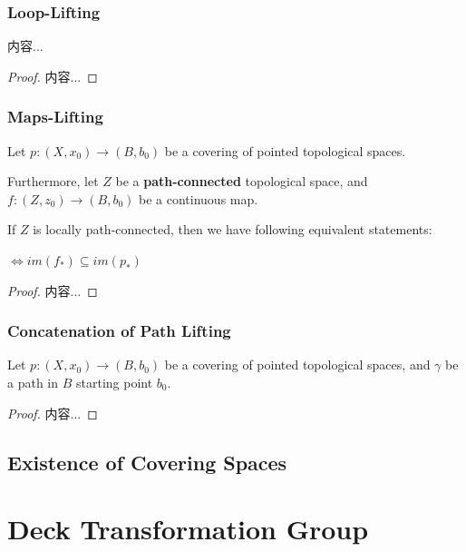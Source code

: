 \documentclass[Total.tex]{subfiles}
\begin{document}
				\subsubsection{Loop-Lifting}
				\begin{proposition}
					内容...
				\end{proposition}
				\begin{proof}
					内容...
				\end{proof}
				\subsubsection{Maps-Lifting}
					\begin{proposition}
						Let $p:(X,x_0)\rightarrow (B,b_0)$ be a covering of pointed topological spaces. 
						
						Furthermore, let $Z$ be a \textbf{path-connected} topological space, and $f:(Z,z_0)\rightarrow (B,b_0)$ be a continuous map. 
						
						If $Z$ is locally path-connected, then we have following equivalent statements:
						\begin{center}
							$\Leftrightarrow im(f_*)\subseteq im(p_*)$ 
						\end{center}
					\end{proposition}
					\begin{proof}
						内容...
					\end{proof}
				\subsubsection{Concatenation of Path Lifting}
					\begin{proposition}
						Let $p:(X,x_0)\rightarrow (B,b_0)$ be a covering of pointed topological spaces, and $\gamma$ be a path in $B$ starting point $b_0$. 
					\end{proposition}
					\begin{proof}
						内容...
					\end{proof}
			\subsection{Existence of Covering Spaces}
		\section{Deck Transformation Group}
\end{document}
